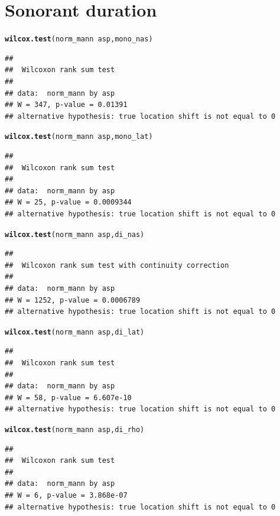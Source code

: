 \documentclass[a4paper,11pt]{article}\usepackage[]{graphicx}\usepackage[]{color}
\makeatletter
\newcommand{\hlopt}[1]{\textcolor[rgb]{0,0,0}{#1}}%
\newcommand{\hlstd}[1]{\textcolor[rgb]{0.345,0.345,0.345}{#1}}%
\newcommand{\hlkwd}[1]{\textcolor[rgb]{0.737,0.353,0.396}{\textbf{#1}}}%
\newenvironment{kframe}{%
 \def\at@end@of@kframe{}%
 \ifinner\ifhmode%
  \def\at@end@of@kframe{\end{minipage}}%
  \begin{minipage}{\columnwidth}%
 \fi\fi%
 \def\FrameCommand##1{\hskip\@totalleftmargin \hskip-\fboxsep
 \colorbox{shadecolor}{##1}\hskip-\fboxsep
     \hskip-\linewidth \hskip-\@totalleftmargin \hskip\columnwidth}%
 \MakeFramed {\advance\hsize-\width
   \@totalleftmargin\z@ \linewidth\hsize
   \@setminipage}}%
 {\par\unskip\endMakeFramed%
 \at@end@of@kframe}
\newenvironment{knitrout}{}{} %
\makeatother
\begin{document}
\section{Sonorant duration}
\begin{knitrout}
\color{fgcolor}\begin{kframe}
\begin{alltt}
\hlkwd{wilcox.test}\hlstd{(norm_mann} \hlopt{~} \hlstd{asp, mono_nas)}
\end{alltt}
\begin{verbatim}
## 
## 	Wilcoxon rank sum test
## 
## data:  norm_mann by asp
## W = 347, p-value = 0.01391
## alternative hypothesis: true location shift is not equal to 0
\end{verbatim}
\begin{alltt}
\hlkwd{wilcox.test}\hlstd{(norm_mann} \hlopt{~} \hlstd{asp, mono_lat)}
\end{alltt}
\begin{verbatim}
## 
## 	Wilcoxon rank sum test
## 
## data:  norm_mann by asp
## W = 25, p-value = 0.0009344
## alternative hypothesis: true location shift is not equal to 0
\end{verbatim}
\begin{alltt}
\hlkwd{wilcox.test}\hlstd{(norm_mann} \hlopt{~} \hlstd{asp, di_nas)}
\end{alltt}
\begin{verbatim}
## 
## 	Wilcoxon rank sum test with continuity correction
## 
## data:  norm_mann by asp
## W = 1252, p-value = 0.0006789
## alternative hypothesis: true location shift is not equal to 0
\end{verbatim}
\begin{alltt}
\hlkwd{wilcox.test}\hlstd{(norm_mann} \hlopt{~} \hlstd{asp, di_lat)}
\end{alltt}
\begin{verbatim}
## 
## 	Wilcoxon rank sum test
## 
## data:  norm_mann by asp
## W = 58, p-value = 6.607e-10
## alternative hypothesis: true location shift is not equal to 0
\end{verbatim}
\begin{alltt}
\hlkwd{wilcox.test}\hlstd{(norm_mann} \hlopt{~} \hlstd{asp, di_rho)}
\end{alltt}
\begin{verbatim}
## 
## 	Wilcoxon rank sum test
## 
## data:  norm_mann by asp
## W = 6, p-value = 3.868e-07
## alternative hypothesis: true location shift is not equal to 0
\end{verbatim}

\end{kframe}
\end{knitrout}
\end{document}
